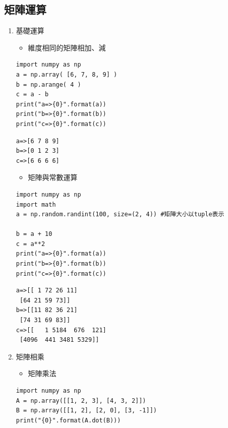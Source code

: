 \documentclass[a4paper,12pt]{article}
\begin{document}
\subsection{矩陣運算}
\label{sec:org23509c5}
\begin{enumerate}
\item 基礎運算
\label{sec:orgc6ae1df}
\begin{itemize}
\item 維度相同的矩陣相加、減\\
\end{itemize}
\lstset{breaklines=true,language=Python,label= ,caption= ,captionpos=b,firstnumber=1,numbers=left}
\begin{lstlisting}
import numpy as np
a = np.array( [6, 7, 8, 9] )
b = np.arange( 4 )
c = a - b
print("a=>{0}".format(a))
print("b=>{0}".format(b))
print("c=>{0}".format(c))
\end{lstlisting}
\begin{verbatim}
a=>[6 7 8 9]
b=>[0 1 2 3]
c=>[6 6 6 6]
\end{verbatim}

\begin{itemize}
\item 矩陣與常數運算\\
\end{itemize}
\lstset{breaklines=true,language=Python,label= ,caption= ,captionpos=b,firstnumber=1,numbers=left}
\begin{lstlisting}
import numpy as np
import math
a = np.random.randint(100, size=(2, 4)) #矩陣大小以tuple表示

b = a + 10
c = a**2
print("a=>{0}".format(a))
print("b=>{0}".format(b))
print("c=>{0}".format(c))
\end{lstlisting}

\begin{verbatim}
a=>[[ 1 72 26 11]
 [64 21 59 73]]
b=>[[11 82 36 21]
 [74 31 69 83]]
c=>[[   1 5184  676  121]
 [4096  441 3481 5329]]
\end{verbatim}
\item 矩陣相乘
\label{sec:org903c537}
\begin{itemize}
\item 矩陣乘法\\
\end{itemize}
\lstset{breaklines=true,language=Python,label= ,caption= ,captionpos=b,firstnumber=1,numbers=left}
\begin{lstlisting}
import numpy as np
A = np.array([[1, 2, 3], [4, 3, 2]])
B = np.array([[1, 2], [2, 0], [3, -1]])
print("{0}".format(A.dot(B)))
\end{lstlisting}


\end{enumerate}
\end{document}
